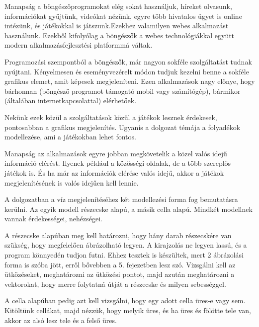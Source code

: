 
Manapság a böngészőprogramokat elég sokat használjuk, híreket olvasunk, információkat gyűjtünk, videókat nézünk, egyre több hivatalos ügyet is online intézünk, és játékokkal is játszunk.Ezekhez valamilyen webes alkalmazást használunk. Ezekből kifolyólag a böngészők a webes technológiákkal együtt modern alkalmazásfejlesztési platformmá váltak. 

Programozási szempontból a böngészők, már nagyon sokféle szolgáltatást tudnak nyújtani. Kényelmesen és eseményvezérelt módon tudjuk kezelni benne a sokféle grafikus elemet, amit képesek megjeleníteni. Ezen alkalmazások nagy előnye, hogy bárhonnan (böngésző programot támogató mobil vagy számítógép), bármikor (általában internetkapcsolattal) elérhetőek. 

Nekünk ezek közül a szolgáltatások közül a játékok lesznek érdekesek, pontosabban a grafikus megjelenítés. Ugyanis a dolgozat témája a folyadékok modellezése, ami a játékokban lehet fontos. 

Manapság az alkalmazások egyre jobban megkövetelik a közel valós idejű információ elérést. Ilyenek például a közösségi oldalak, de a több szereplős játékok is. És ha már az információk elérése valós idejű, akkor a játékok megjelenítésének is valós idejűen kell lennie.

A dolgozatban a víz megjelenítéséhez két modellezési forma fog bemutatásra kerülni. Az egyik modell részecske alapú, a másik cella alapú. Mindkét modellnek vannak érdekességei, nehézségei. 


A részecske alapúban meg kell határozni, hogy hány darab részecskére van szükség, hogy megfelelően ábrázolható legyen. A kirajzolás ne legyen lassú, és a program könnyedén tudjon futni. Ehhez tesztek is készültek, mert 2 ábrázolási forma is szóba jött, erről bővebben a 5. fejezetben lesz szó. Vizsgálni kell az ütközéseket, meghatározni az ütközési pontot, majd azután meghatározni a vektorokat, hogy merre folytatná útját a részecske és milyen sebességgel.

A cella alapúban pedig azt kell vizsgálni, hogy egy adott cella üres-e vagy sem. Kitöltünk cellákat, majd nézzük, hogy melyik üres, és ha üres és fölötte tele van, akkor az alsó lesz tele és a felső üres. 

